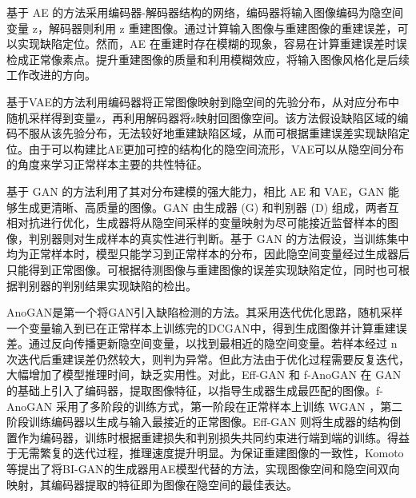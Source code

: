 基于 AE 的方法采用编码器-解码器结构的网络，编码器将输入图像编码为隐空间变量 z，解码器则利用 z 重建图像。通过计算输入图像与重建图像的重建误差，可以实现缺陷定位。然而，AE 在重建时存在模糊的现象，容易在计算重建误差时误检成正常像素点。提升重建图像的质量和利用模糊效应，将输入图像风格化是后续工作改进的方向。

基于VAE的方法利用编码器将正常图像映射到隐空间的先验分布，从对应分布中随机采样得到变量z，再利用解码器将z映射回图像空间。该方法假设缺陷区域的编码不服从该先验分布，无法较好地重建缺陷区域，从而可根据重建误差实现缺陷定位。由于可以构建比AE更加可控的结构化的隐空间流形，VAE可以从隐空间分布的角度来学习正常样本主要的共性特征。

基于 GAN 的方法利用了其对分布建模的强大能力，相比 AE 和 VAE，GAN 能够生成更清晰、高质量的图像。GAN 由生成器 (G) 和判别器 (D) 组成，两者互相对抗进行优化，生成器将从隐空间采样的变量映射为尽可能接近监督样本的图像，判别器则对生成样本的真实性进行判断。基于 GAN 的方法假设，当训练集中均为正常样本时，模型只能学习到正常样本的分布，因此隐空间变量经过生成器后只能得到正常图像。可根据待测图像与重建图像的误差实现缺陷定位，同时也可根据判别器的判别结果实现缺陷的检出。

AnoGAN\cite{schleglUnsupervisedAnomalyDetection2017}是第一个将GAN引入缺陷检测的方法。其采用迭代优化思路，随机采样一个变量输入到已在正常样本上训练完的DCGAN\cite{radfordUnsupervisedRepresentationLearning2016}中，得到生成图像并计算重建误差。通过反向传播更新隐空间变量，以找到最相近的隐空间变量。若样本经过 n 次迭代后重建误差仍然较大，则判为异常。但此方法由于优化过程需要反复迭代，大幅增加了模型推理时间，缺乏实用性。对此，Eff-GAN\cite{zenatiEfficientGANBasedAnomaly2019} 和 f-AnoGAN\cite{schleglFAnoGANFastUnsupervised2019} 在 GAN 的基础上引入了编码器，提取图像特征，以指导生成器生成最匹配的图像。f-AnoGAN 采用了多阶段的训练方式，第一阶段在正常样本上训练 WGAN \cite{gulrajaniImprovedTrainingWasserstein2017}，第二阶段训练编码器以生成与输入最接近的正常图像。Eff-GAN 则将生成器的结构倒置作为编码器，训练时根据重建损失和判别损失共同约束进行端到端的训练。得益于无需繁复的迭代过程，推理速度提升明显。为保证重建图像的一致性，Komoto等\cite{komotoConsistencyEnsuredBidirectional2020}提出了将BI-GAN\cite{donahueAdversarialFeatureLearning2017}的生成器用AE模型代替的方法，实现图像空间和隐空间双向映射，其编码器提取的特征即为图像在隐空间的最佳表达。


